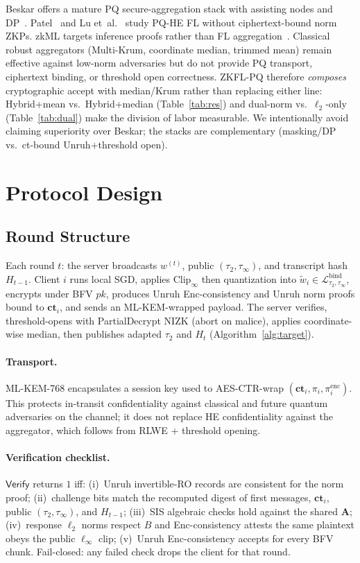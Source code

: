 \documentclass[conference]{IEEEtran}
\newcommand{\Verify}{\mathsf{Verify}}
\begin{document}
Beskar offers a mature PQ secure-aggregation stack with assisting nodes and DP~\cite{zhang2025beskar}. Patel~\cite{patel2025pqfl} and Lu et~al.~\cite{lu2024hybrid} study PQ-HE FL without ciphertext-bound norm ZKPs. zkML targets inference proofs rather than FL aggregation~\cite{kang2022zkml}. Classical robust aggregators (Multi-Krum, coordinate median, trimmed mean) remain effective against low-norm adversaries but do not provide PQ transport, ciphertext binding, or threshold open correctness. ZKFL-PQ therefore \emph{composes} cryptographic accept with median/Krum rather than replacing either line: Hybrid+mean vs.\ Hybrid+median (Table~\ref{tab:res}) and dual-norm vs.\ $\ell_2$-only (Table~\ref{tab:dual}) make the division of labor measurable. We intentionally avoid claiming superiority over Beskar; the stacks are complementary (masking/DP vs.\ ct-bound Unruh+threshold open).

\section{Protocol Design}

\subsection{Round Structure}
Each round $t$: the server broadcasts $w^{(t)}$, public $(\tau_2,\tau_\infty)$, and transcript hash $H_{t-1}$. Client $i$ runs local SGD, applies $\mathrm{Clip}_\infty$ then quantization into $\tilde{w}_i\in\mathcal{L}_{\tau_2,\tau_\infty}^{\mathrm{bind}}$, encrypts under BFV $pk$, produces Unruh Enc-consistency and Unruh norm proofs bound to $\mathbf{ct}_i$, and sends an ML-KEM-wrapped payload. The server verifies, threshold-opens with PartialDecrypt NIZK (abort on malice), applies coordinate-wise median, then publishes adapted $\tau_2$ and $H_t$ (Algorithm~\ref{alg:target}).

\paragraph{Transport.}
ML-KEM-768 encapsulates a session key used to AES-CTR-wrap $(\mathbf{ct}_i,\pi_i,\pi_i^{\mathrm{enc}})$. This protects in-transit confidentiality against classical and future quantum adversaries on the channel; it does not replace HE confidentiality against the aggregator, which follows from RLWE + threshold opening.

\paragraph{Verification checklist.}
$\Verify$ returns $1$ iff: (i)~Unruh invertible-RO records are consistent for the norm proof; (ii)~challenge bits match the recomputed digest of first messages, $\mathbf{ct}_i$, public $(\tau_2,\tau_\infty)$, and $H_{t-1}$; (iii)~SIS algebraic checks hold against the shared $\mathbf{A}$; (iv)~response $\ell_2$ norms respect $B$ and Enc-consistency attests the same plaintext obeys the public $\ell_\infty$ clip; (v)~Unruh Enc-consistency accepts for every BFV chunk. Fail-closed: any failed check drops the client for that round.
\end{document}
